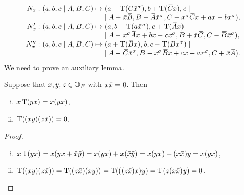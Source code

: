 \begin{equation}
	\label{eq:3_nx_image}
	\begin{array}{r@{\;}c@{\;}l}
		N_x: (a,b,c\mid A,B,C) & \mapsto &
		(a-\Tr(C\ovx ^{\s}), b+\Tr(\ovC x), c \mid \\
		& & \mid	A+\ovx \ovB , B-\ovA \ovx ^{\s},C-x^{\s}\ovC x+ax-bx^{\s}), \\
		
		N_x': (a,b,c\mid A,B,C) & \mapsto & 
		(a, b-\Tr(a\ovx^{\s}), c+\Tr(\ovA x) \mid \\
		& & \mid	A - x^{\s} \ovA x + bx-cx^{\s}, B + \ovx \ovC, C - \ovB \ovx^{\s}), \\
		
		N_x'': (a,b,c\mid A,B,C) & \mapsto &
		(a+\Tr(\ovB x), b, c-\Tr(B\ovx^{\s}) \mid \\
		& & \mid 	A-\ovC\ovx^{\s}, B-x^{\s}\ovB x + cx - ax^{\s}, C+\ovx\ovA).
	\end{array}
\end{equation}
We need to prove an auxiliary lemma.

\begin{lemma}
	\label{lemma:3_oct_aux}
	Suppose that $x,y,z \in \mathbb{O}_F$ with $x \mathord{\mbox{\hspace*{0pt}}\,\overline{\!x\!\!\;}\!\:}\mbox{\hspace*{0pt}}  = 0$. Then
		\begin{enumerate}[(i)]
			\item $x\operatorname{T}(yx) = x(yx)$,
			\item $\operatorname{T}( (xy)(z\mathord{\mbox{\hspace*{0pt}}\,\overline{\!x\!\!\;}\!\:}\mbox{\hspace*{0pt}} ) ) = 0$.		
		\end{enumerate}
\end{lemma}

\begin{proof}
	\leavevmode
	\begin{enumerate}[(i)]
	
	\item $x\Tr(yx) = x (yx + \ovx \ovy ) = x(yx) + x(\ovx \ovy )
		 = x(yx) + (x\ovx )y = x(yx)$,
		 
	\item $\Tr( (xy)(z\ovx ) ) = \Tr( (z\ovx ) (xy) ) = \Tr( ((z\ovx )x) y ) = 
		\Tr(z(x\ovx )y) = 0$. \qedhere
	\end{enumerate}
\end{proof}

